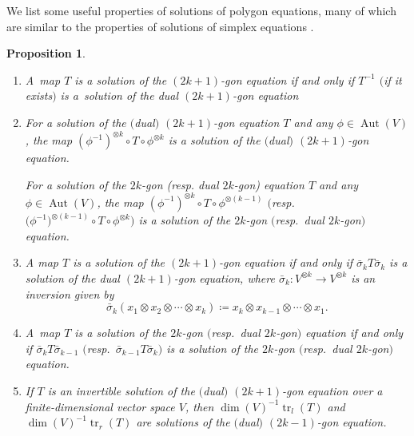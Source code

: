 \documentclass[10pt,a4paper]{amsart}
\numberwithin{equation}{section}
\newtheorem{Proposition}[Theorem]{Proposition}
\theoremstyle{definition}
\begin{document}
We list some useful properties of solutions of polygon equations, many of which are similar to the properties of solutions of simplex equations \cite{bardakov2024set}.
\begin{Proposition}\label{prop:usefulpolygon}\quad
 \begin{enumerate}\itemsep=0pt
 \item[$(1)$] A~map $T$ is a solution of the $(2k+1)$-gon equation if and only if $T^{-1}$ $($if it exists$)$ is a~solution of the dual $(2k+1)$-gon equation
 \item[$(2)$] For a solution of the $($dual$)$ $(2k+1)$-gon equation $T$ and any $\phi\in\operatorname{Aut}(V)$, the map $(\phi^{-1})^{\otimes k}\circ T\circ\phi^{\otimes k}$ is a solution of the $($dual$)$ $(2k+1)$-gon equation.

 For a solution of the $2k$-gon (resp. dual $2k$-gon) equation $T$ and any $\phi\in\operatorname{Aut}(V)$, the map $(\phi^{-1})^{\otimes k}\circ T\circ\phi^{\otimes (k-1)}$ $($resp.\ $\bigl(\phi^{-1}\bigr)^{\otimes (k-1)}\circ T\circ\phi^{\otimes k})$ is a solution of the $2k$-gon $($resp.\ dual $2k$-gon$)$ equation.
 \item[$(3)$] A map $T$ is a solution of the $(2k+1)$-gon equation if and only if $\bar{\sigma}_k T\bar{\sigma}_k $ is a solution of the dual $(2k+1)$-gon equation, where $\bar{\sigma}_k\colon V^{\otimes k}\to V^{\otimes k}$ is an inversion given by
 \begin{equation}\label{eq:inversion}
 \bar{\sigma}_k(x_1\otimes x_2\otimes\cdots\otimes x_k) \coloneqq x_k\otimes x_{k-1}\otimes \cdots\otimes x_1.
 \end{equation}
 \item[$(4)$] A~map $T$ is a solution of the $2k$-gon $($resp.\ dual $2k$-gon$)$ equation if and only if $\bar{\sigma}_{k}T\bar{\sigma}_{k-1}$ $($resp.\ $\bar{\sigma}_{k-1}T\bar{\sigma}_{k})$ is a solution of the $2k$-gon $($resp.\ dual $2k$-gon$)$ equation.

 \item[$(5)$] If $T$ is an invertible solution of the $($dual$)$ $(2k+1)$-gon equation over a finite-dimensional vector space $V$, then $\dim(V)^{-1}\operatorname{tr}_l(T)$ and $\dim(V)^{-1}\operatorname{tr}_r(T)$ are solutions of the $($dual$)$ $(2k-1)$-gon equation.%
 \end{enumerate}
\end{Proposition}
\end{document}
